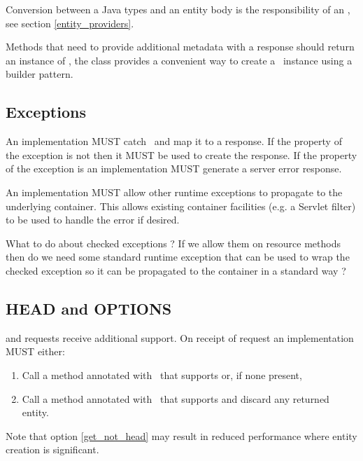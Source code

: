 Conversion between a Java types and an entity body is the responsibility of an \EntityProvider, see section \ref{entity_providers}.

Methods that need to provide additional metadata with a response should return an instance of \Response, the \Response{} class provides a convenient way to create a \Response\ instance using a builder pattern.

\subsection{Exceptions}

An implementation MUST catch \WebAppExc\ and map it to a response. If the  property of the exception is not  then it MUST be used to create the response. If the  property of the exception is  an implementation MUST generate a server error response.

An implementation MUST allow other runtime exceptions to propagate to the underlying container. This allows existing container facilities (e.g. a Servlet filter) to be used to handle the error if desired.

\begin{ednote}What to do about checked exceptions ? If we allow them on resource methods then do we need some standard runtime exception that can be used to wrap the checked exception so it can be propagated to the container in a standard way ?\end{ednote}

\subsection{HEAD and OPTIONS}
\label{head_and_options}

 and  requests receive additional support. On receipt of  request an implementation MUST either:

\begin{enumerate}
\item Call a method annotated with \HttpMethod\ that supports  or, if none present,
\item\label{get_not_head} Call a method annotated with \HttpMethod\ that supports  and discard any returned entity.
\end{enumerate}

Note that option \ref{get_not_head} may result in reduced performance where entity creation is significant.

